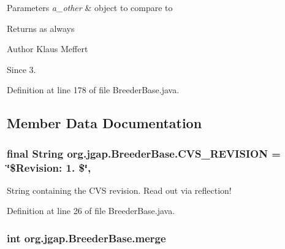 \begin{DoxyParams}{Parameters}
{\em a\-\_\-other} & object to compare to \\
\hline
\end{DoxyParams}
\begin{DoxyReturn}{Returns}
as always
\end{DoxyReturn}
\begin{DoxyAuthor}{Author}
Klaus Meffert 
\end{DoxyAuthor}
\begin{DoxySince}{Since}
3. 
\end{DoxySince}


Definition at line 178 of file Breeder\-Base.\-java.



\subsection{Member Data Documentation}
\hypertarget{classorg_1_1jgap_1_1_breeder_base_aa8696d77b1b808a291d4760794651713}{
\subsubsection[{C\-V\-S\-\_\-\-R\-E\-V\-I\-S\-I\-O\-N}]{\setlength{\rightskip}{0pt plus 5cm}final String org.\-jgap.\-Breeder\-Base.\-C\-V\-S\-\_\-\-R\-E\-V\-I\-S\-I\-O\-N = \char`\"{}\$Revision\-: 1. \$\char`\"{}\hspace{0.3cm}{\ttfamily [static]}, {\ttfamily [private]}}}\label{classorg_1_1jgap_1_1_breeder_base_aa8696d77b1b808a291d4760794651713}
String containing the C\-V\-S revision. Read out via reflection! 

Definition at line 26 of file Breeder\-Base.\-java.

\hypertarget{classorg_1_1jgap_1_1_breeder_base_a4facd977a198d2377912156a74d87515}{
\subsubsection[{merge}]{\setlength{\rightskip}{0pt plus 5cm}int org.\-jgap.\-Breeder\-Base.\-merge}}\label{classorg_1_1jgap_1_1_breeder_base_a4facd977a198d2377912156a74d87515}


